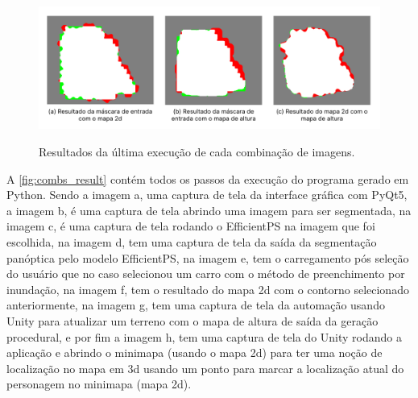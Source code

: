 \begin{figure}[!ht]
	\centering
    \caption{Resultados da última execução de cada combinação de imagens.}
	\includegraphics[width=\textwidth]{figures/comb_results_final.png}
	\label{fig:result_final}
\end{figure}

A \cref{fig:combs_result} contém todos os passos da execução do programa gerado em Python. Sendo a imagem a, uma captura de tela da interface gráfica com PyQt5, a imagem b, é uma captura de tela abrindo uma imagem para ser segmentada, na imagem c, é uma captura de tela rodando o EfficientPS na imagem que foi escolhida, na imagem d, tem uma captura de tela da saída da segmentação panóptica pelo modelo EfficientPS, na imagem e, tem o carregamento pós seleção do usuário que no caso selecionou um carro com o método de preenchimento por inundação, na imagem f, tem o resultado do mapa 2d com o contorno selecionado anteriormente, na imagem g, tem uma captura de tela da automação usando Unity para atualizar um terreno com o mapa de altura de saída da geração procedural, e por fim a imagem h, tem uma captura de tela do Unity rodando a aplicação e abrindo o minimapa (usando o mapa 2d) para ter uma noção de localização no mapa em 3d usando um ponto para marcar a localização atual do personagem no minimapa (mapa 2d).

